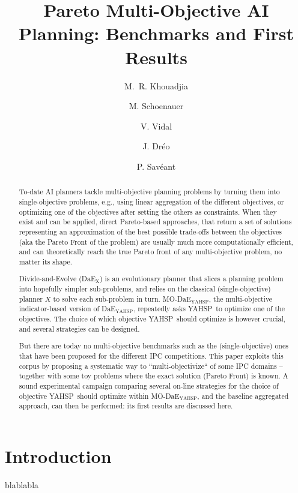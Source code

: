 \documentclass[letterpaper]{article}
\title{Pareto Multi-Objective AI Planning: Benchmarks and First Results}
\author{M.~R. Khouadjia \and M. Schoenauer \and V. Vidal \and J. Dr\'eo \and P. Sav\'eant}
\newcommand{\DAEX}{{\sc DaE$_{\text{X}}$}}
\newcommand{\DAEYAHSP}{{\sc DaE$_{\text{YAHSP}}$}}
\newcommand{\MODAEYAHSP}{{\sc MO-DaE$_{\text{YAHSP}}$}}
\newcommand{\YAHSP}{{\sc YAHSP}}
\begin{document}
\maketitle

\begin{abstract}
To-date AI planners tackle multi-objective planning problems by turning them into single-objective problems, e.g., using linear aggregation of the different objectives, or optimizing one of the objectives after setting the others as constraints. When they exist and can be applied, direct Pareto-based approaches, that return a set of solutions representing an approximation of the best possible trade-offs between the objectives (aka the Pareto Front of the problem) are usually much more computationally efficient, and can theoretically reach the true Pareto front of any multi-objective problem, no matter its shape. 

Divide-and-Evolve (\DAEX) is an evolutionary planner that slices a planning problem into hopefully simpler sub-problems, and relies on the classical (single-objective) planner $X$ to solve each sub-problem in turn. \MODAEYAHSP, the multi-objective indicator-based version of \DAEYAHSP, repeatedly asks \YAHSP\ to optimize one of the objectives. The choice of which objective \YAHSP\ should optimize is however crucial, and several strategies can be designed.

But there are today no multi-objective benchmarks such as the (single-objective) ones that have been proposed for the different IPC competitions. This paper exploits this corpus by proposing a systematic way to ``multi-objectivize`` of some IPC domains -- together with some toy problems where the exact solution (Pareto Front) is known. A sound experimental campaign comparing several on-line strategies for the choice of objective \YAHSP\ should optimize within \MODAEYAHSP, and the baseline aggregated approach, can then be performed: its first results are discussed here.
\end{abstract}

\section{Introduction}
blablabla
\end{document}
